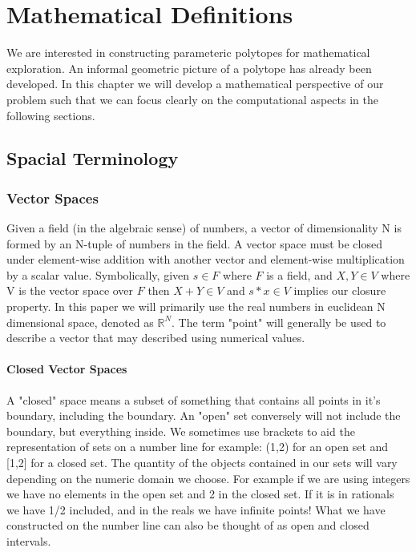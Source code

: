 
\chapter{Mathematical Definitions}

We are interested in constructing parameteric polytopes for
mathematical exploration. An informal geometric
picture of a polytope has already been developed.
In this chapter we will develop a mathematical perspective of our problem
such that we can focus clearly on the computational aspects in the following
sections. 


\section{Spacial Terminology}

\subsection{Vector Spaces}

Given a field (in the algebraic sense) of numbers, a vector of dimensionality
N is formed by an N-tuple of numbers in the field. A vector space must
be closed under element-wise addition with another vector and element-wise
multiplication by a scalar value. Symbolically, given $s \in F$ where $F$ is a
field, and $X,Y \in V$ where V is the vector space over $F$ then
$X+Y \in V$ and $s*x \in V$ implies our closure property.
In this paper we will primarily use
the real numbers in euclidean N dimensional space, denoted as $\mathbb{R}^N$.
The term "point" will generally be used to describe a vector that may
described using numerical values.

\subsubsection{Closed Vector Spaces}

A "closed" space means a subset of something that contains all points in it's
boundary, including the boundary.
 An "open" set conversely will not include
the boundary, but everything inside.
We sometimes use brackets to aid the representation of sets on a number line
for example: (1,2) for an open set and
[1,2] for a closed set. The quantity of the objects contained in our sets
will vary depending on the numeric domain we choose.
For example if we are using integers we have no
elements in the open set and 2 in the closed set. If it is in rationals we
have 1/2 included, and in the reals we have infinite points! What we have
constructed on the number line can also be thought of as open
and closed intervals.


